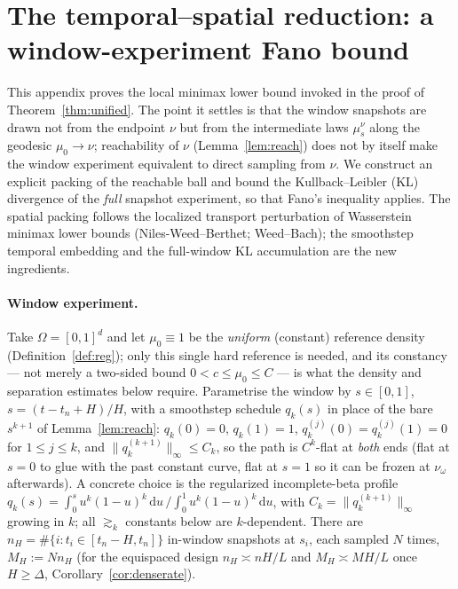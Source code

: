 \documentclass[11pt]{article}
\theoremstyle{definition}
\theoremstyle{remark}
\begin{document}
\section{The temporal--spatial reduction: a window-experiment Fano bound}\label{app:reduction}
This appendix proves the local minimax lower bound invoked in the proof of
Theorem~\ref{thm:unified}. The point it settles is that the window snapshots are drawn not from the
endpoint $\nu$ but from the intermediate laws $\mu_s^{\nu}$ along the geodesic $\mu_0\to\nu$;
reachability of $\nu$ (Lemma~\ref{lem:reach}) does not by itself make the window experiment
equivalent to direct sampling from $\nu$. We construct an explicit packing of the reachable ball and
bound the Kullback--Leibler (KL) divergence of the \emph{full} snapshot experiment, so that Fano's
inequality applies. The spatial packing follows the localized transport perturbation of Wasserstein
minimax lower bounds (Niles-Weed--Berthet; Weed--Bach); the smoothstep temporal embedding and the
full-window KL accumulation are the new ingredients.

\paragraph{Window experiment.} Take $\Omega=[0,1]^d$ and let $\mu_0\equiv1$ be the \emph{uniform}
(constant) reference density (Definition~\ref{def:reg}); only this single hard reference is needed,
and its constancy --- not merely a two-sided bound $0<c\le\mu_0\le C$ --- is what the density and
separation estimates below require. Parametrise the window by
$s\in[0,1]$, $s=(t-t_n+H)/H$, with a smoothstep schedule $q_k(s)$ in place of the bare $s^{k+1}$ of
Lemma~\ref{lem:reach}: $q_k(0)=0$, $q_k(1)=1$, $q_k^{(j)}(0)=q_k^{(j)}(1)=0$ for $1\le j\le k$, and
$\|q_k^{(k+1)}\|_\infty\le C_k$, so the path is $C^k$-flat at \emph{both} ends (flat at $s=0$ to glue
with the past constant curve, flat at $s=1$ so it can be frozen at $\nu_\omega$ afterwards). A concrete
choice is the regularized incomplete-beta profile
$q_k(s)=\int_0^s u^k(1-u)^k\,\mathrm du\,\big/\!\int_0^1 u^k(1-u)^k\,\mathrm du$, with
$C_k=\|q_k^{(k+1)}\|_\infty$ growing in $k$; all $\gtrsim_k$ constants below are $k$-dependent. There are
$n_H=\#\{i:t_i\in[t_n-H,t_n]\}$ in-window snapshots at $s_i$, each sampled $N$ times, $M_H:=Nn_H$ (for the equispaced design $n_H\asymp nH/L$ and $M_H\asymp MH/L$ once $H\ge\Delta$, Corollary~\ref{cor:denserate}).
\end{document}

